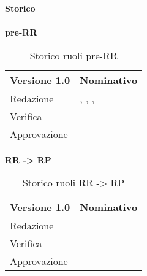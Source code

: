 \newpage
\Large{\textbf{Storico }}\\
\normalsize \\

\textbf{pre-RR}
\label{tabVers1}
\begin{table}[h]
	\begin{tabular}{p{} p{}}
		\toprule \textbf{Versione 1.0}	&	\textbf{Nominativo}\\
		\midrule Redazione	& \BM, \TP, \PM, \FM\\
		\midrule Verifica &	\VG\\
		\midrule Approvazione	&	\TP\\
		\bottomrule
	\end{tabular}
	\caption{Storico ruoli pre-RR}
\end{table}

\textbf{RR -> RP}
\label{tabVers2}
\begin{table}[h]
	\begin{tabular}{p{} p{}}
		\toprule \textbf{Versione 1.0}	&	\textbf{Nominativo}\\
		\midrule Redazione	& \PM\\
		\midrule Verifica &	\TP\\
		\midrule Approvazione	&	\VG\\
		\bottomrule
	\end{tabular}
	\caption{Storico ruoli RR -> RP}
\end{table}